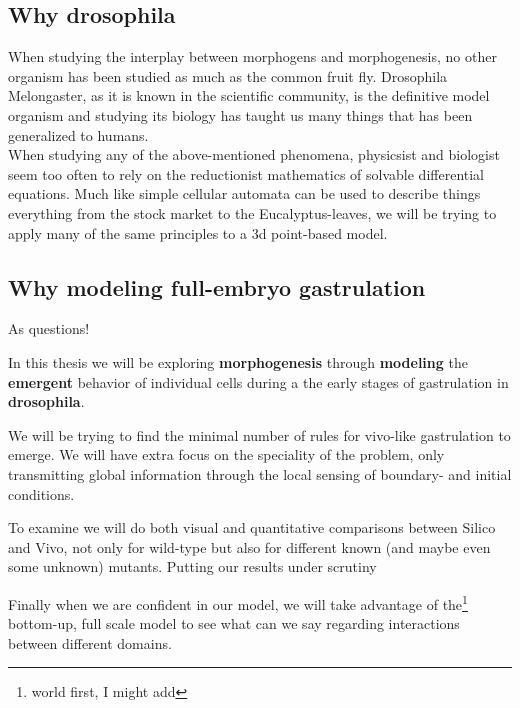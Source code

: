 \subsection{Why drosophila}
When studying the interplay between morphogens and morphogenesis, no other organism has been studied as much as the common fruit fly. Drosophila Melongaster, as it is known in the scientific community, is the definitive model organism and studying its biology has taught us many things that has been generalized to humans. \\


When studying any of the above-mentioned phenomena, physicsist and biologist seem too often to rely on the reductionist mathematics of solvable differential equations. Much like simple cellular automata can be used to describe things everything from the stock market to the Eucalyptus-leaves, we will be trying to apply many of the same principles to a 3d point-based model.

\subsection{Why modeling full-embryo gastrulation }
As questions!








In this thesis we will be exploring \textbf{morphogenesis} through \textbf{modeling} the \textbf{emergent} behavior of individual cells during a the early stages of  gastrulation in \textbf{drosophila}.

We will be trying to find the minimal number of rules for vivo-like gastrulation to emerge. We will have extra focus on the speciality of the problem, only transmitting global information through the local sensing of boundary- and initial conditions.

To examine we will do both visual and quantitative comparisons between Silico and Vivo, not only for wild-type but also for different known (and maybe even some unknown) mutants. Putting our results under scrutiny 

Finally when we are confident in our model, we will take advantage of the\footnote{world first, I might add} bottom-up, full scale model to see what can we say regarding interactions between different domains.\\


